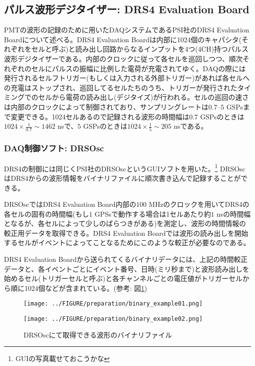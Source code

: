 \documentclass[../../main.tex]{subfiles}
\numberwithin{equation}{section}
\numberwithin{table}{section}
\numberwithin{figure}{section}
\begin{document}
        \FloatBarrier
\subsection{パルス波形デジタイザー: DRS4 Evaluation Board}
PMTの波形の記録のために用いたDAQシステムであるPSI社のDRS4 Evaluation Boardについて述べる。DRS4 Evaluation Boardは内部に1024個のキャパシタ(それぞれをセルと呼ぶ)と読み出し回路からなるインプットを4つ(4CH)持つパルス波形デジタイザーである。内部のクロックに従って各セルを巡回しつつ、順次それぞれのセルにパルスの振幅に比例した電荷が充電されてゆく。DAQの際には発行されるセルフトリガー(もしくは入力される外部トリガー)があれば各セルへの充電はストップされ、巡回してるセルたちのうち、トリガーが発行されたタイミングでのセルから電荷の読み出し(デジタイズ)が行われる。セルの巡回の速さは内部のクロックによって制御されており、サンプリングレートは$0.7$--$5$ GSPsまで変更できる。1024セルあるので記録される波形の時間幅は$0.7$ GSPsのときは$1024\times\frac{1}{0.7}\sim1462$ nsで、$5$ GSPsのときは$1024\times\frac{1}{5}\sim205$ nsである。

\FloatBarrier
\subsubsection{DAQ制御ソフト: DRSOsc}
  DRS4の制御には同じくPSI社のDRSOscというGUIソフトを用いた。\footnote{GUIの写真載せておこうかな} DRSOscはDRS4からの波形情報をバイナリファイルに順次書き込んで記録することができる。

  DRSOscではDRS4 Evaluation Board内部の$100$ \si{\mega\hertz}のクロックを用いてDRS4の各セルの固有の時間幅(もし$1$ GPSsで動作する場合は1セルあたり約$1$ nsの時間幅となるが、各セルによって少しのばらつきがある)を測定し、波形の時間情報の較正用データを取得できる。DRS4 Evaluation Boardでは波形の読み出しを開始するセルがイベントによってことなるためにこのような較正が必要なのである。

  DRS4 Evaluation Boardから送られてくるバイナリデータには、上記の時間較正データと、各イベントごとにイベント番号、日時(ミリ秒まで)と波形読み出しを始めるセル(トリガーセルと呼ぶ)と各チャンネルごとの電圧値がトリガーセルから順に1024個などが含まれている。(参考: 図\ref{fig:preparation_binary_example})

  \begin{figure}[H]
    \begin{minipage}[b]{0.48\columnwidth}
      \centering
      \texttt{[image: ../FIGURE/preparation/binary\_example01.png]}
      \label{fig:preparation_binary01}
    \end{minipage}
    \hspace{0.04\columnwidth} %
    \begin{minipage}[b]{0.48\columnwidth}
      \centering
      \texttt{[image: ../FIGURE/preparation/binary\_example02.png]}
      \label{fig:preparation_binary02}
    \end{minipage}
    \caption{DRSOscにて取得できる波形のバイナリファイル\cite{preparation:DRS4_manual}}\label{fig:preparation_binary_example}
  \end{figure}
\end{document}
